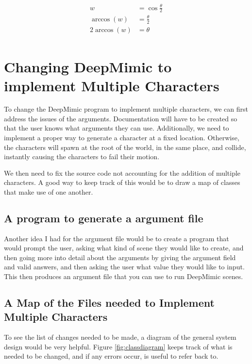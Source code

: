 \documentclass{l4proj}
\begin{document}
\begin{equation}
  \begin{aligned}
    w &= \cos\frac{\theta}{2}\\
    \arccos (w) &=\frac{\theta}{2}\\
    2\arccos (w) &=\theta\\
  \end{aligned}
\end{equation}
\clearpage
\section{Changing DeepMimic to implement Multiple Characters}
To change the DeepMimic program to implement multiple characters, we can first address the issues of the arguments. Documentation will have to be created so that the user knows what arguments they can use. Additionally, we need to implement a proper way to generate a character at a fixed location. Otherwise, the characters will spawn at the root of the world, in the same place, and collide, instantly causing the characters to fail their motion.

We then need to fix the source code not accounting for the addition of multiple characters. A good way to keep track of this would be to draw a map of classes that make use of one another.

\subsection{A program to generate a argument file}
Another idea I had for the argument file would be to create a program that would prompt the user, asking what kind of scene they would like to create, and then going more into detail about the arguments by giving the argument field and valid answers, and then asking the user what value they would like to input. This then produces an argument file that you can use to run DeepMimic scenes.

\subsection{A Map of the Files needed to Implement Multiple Characters}

To see the list of changes needed to be made, a diagram of the general system design would be very helpful. Figure \ref{fig:classdiagram} keeps track of what is needed to be changed, and if any errors occur, is useful to refer back to.
\end{document}
